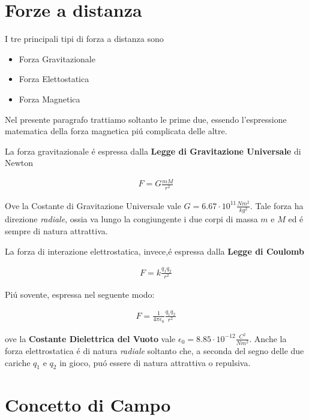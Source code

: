 \documentclass[17pt]{extarticle}
\begin{document}
\section{Forze a distanza}

I tre principali tipi di forza a distanza sono
\begin{itemize}
	\item Forza Gravitazionale
	\item Forza Elettostatica
	\item Forza Magnetica
\end{itemize}

Nel presente paragrafo trattiamo soltanto le prime due, essendo l'espressione matematica della forza magnetica pi\'u complicata delle altre. 

La forza gravitazionale \'e espressa dalla {\bf Legge di Gravitazione Universale} di Newton

\begin{eqnarray}\label{eq:CGU}
	F = G \frac{mM}{r^2}
\end{eqnarray}

Ove la Costante di Gravitazione Universale vale $G = 6.67\cdot 10^{11}\frac{Nm^2}{kg^2}$. Tale forza ha direzione \emph{radiale}, ossia va lungo la congiungente i due corpi di massa $m$ e $M$ ed \'e sempre di natura attrattiva.

La forza di interazione elettrostatica, invece,\'e espressa dalla {\bf Legge di Coulomb}

\begin{eqnarray}
	F = k\frac{q_1q_2}{r^2}
\end{eqnarray}

Pi\'u sovente, espressa nel seguente modo:

\begin{eqnarray}\label{eq:Coulomb}
	F = \frac{1}{4\pi\epsilon_0}\frac{q_1q_2}{r^2}
\end{eqnarray}

ove la {\bf Costante Dielettrica del Vuoto} vale $\epsilon_0 = 8.85\cdot 10^{-12}\frac{C^2}{Nm^2}$. Anche la forza elettrostatica \'e di natura \emph{radiale} soltanto che, a seconda del segno delle due cariche $q_1$ e $q_2$ in gioco, pu\'o essere di natura attrattiva o repulsiva.




\section{Concetto di Campo}
\end{document}
